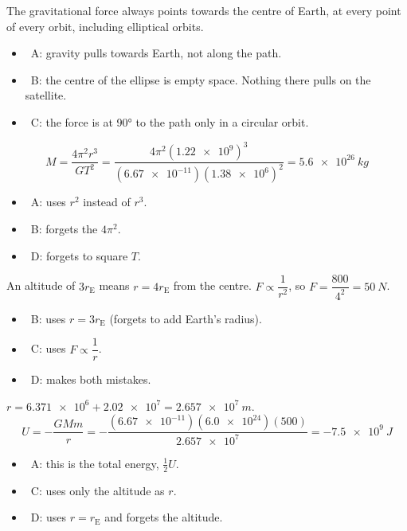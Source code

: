 \documentclass[12pt]{article}
\begin{document}
\begin{practiceanswers}
\begin{practiceans}
  The gravitational force always points towards the centre of Earth, at every point of every
  orbit, including elliptical orbits.
  \begin{itemize}
    \item \xmark\ A: gravity pulls towards Earth, not along the path.
    \item \xmark\ B: the centre of the ellipse is empty space. Nothing there pulls on the satellite.
    \item \xmark\ C: the force is at \ang{90} to the path only in a circular orbit.
  \end{itemize}
\end{practiceans}

\begin{practiceans}
  \[ M = \frac{4\pi^2 r^3}{GT^2} = \frac{4\pi^2(\num{1.22e9})^3}{(\num{6.67e-11})(\num{1.38e6})^2}
       = \qty{5.6e26}{kg} \]
  \begin{itemize}
    \item \xmark\ A: uses $r^2$ instead of $r^3$.
    \item \xmark\ B: forgets the $4\pi^2$.
    \item \xmark\ D: forgets to square $T$.
  \end{itemize}
\end{practiceans}

\begin{practiceans}
  An altitude of $3r_\mathrm{E}$ means $r = 4r_\mathrm{E}$ from the centre. $F \propto \dfrac{1}{r^2}$,
  so $F = \dfrac{800}{4^2} = \qty{50}{N}$.
  \begin{itemize}
    \item \xmark\ B: uses $r = 3r_\mathrm{E}$ (forgets to add Earth's radius).
    \item \xmark\ C: uses $F \propto \dfrac{1}{r}$.
    \item \xmark\ D: makes both mistakes.
  \end{itemize}
\end{practiceans}

\begin{practiceans}
  $r = \num{6.371e6} + \num{2.02e7} = \qty{2.657e7}{m}$.
  \[ U = -\frac{GMm}{r} = -\frac{(\num{6.67e-11})(\num{6.0e24})(500)}{\num{2.657e7}} = \qty{-7.5e9}{J} \]
  \begin{itemize}
    \item \xmark\ A: this is the total energy, $\frac{1}{2}U$.
    \item \xmark\ C: uses only the altitude as $r$.
    \item \xmark\ D: uses $r = r_\mathrm{E}$ and forgets the altitude.
  \end{itemize}
\end{practiceans}


\end{practiceanswers}
\end{document}
